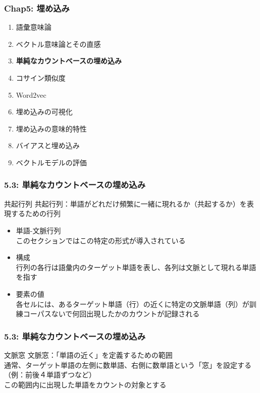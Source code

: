 \documentclass[unicode,11pt]{beamer} %
\begin{document}

\begin{frame}
    \frametitle{Chap5: 埋め込み}
    \begin{block}{}
        \begin{enumerate}
            \item 語彙意味論
            \item ベクトル意味論とその直感
            \item {\color{red}\textbf{単純なカウントベースの埋め込み}}
            \item コサイン類似度
            \item Word2vec
            \item 埋め込みの可視化
            \item 埋め込みの意味的特性
            \item バイアスと埋め込み
            \item ベクトルモデルの評価
        \end{enumerate}
    \end{block}
\end{frame}

\begin{frame}
    \frametitle{5.3: 単純なカウントベースの埋め込み}
    \begin{alertblock}{共起行列}
        共起行列：単語がどれだけ頻繁に一緒に現れるか（共起するか）を表現するための行列
        \begin{itemize}
            \item 単語-文脈行列\\このセクションではこの特定の形式が導入されている
            \item 構成\\行列の各行は語彙内のターゲット単語を表し、各列は文脈として現れる単語を指す
            \item 要素の値\\各セルには、あるターゲット単語（行）の近くに特定の文脈単語（列）が訓練コーパスないで何回出現したかのカウントが記録される
        \end{itemize}
    \end{alertblock}
\end{frame}

\begin{frame}
    \frametitle{5.3: 単純なカウントベースの埋め込み}
    \begin{alertblock}{文脈窓}
        文脈窓：「単語の近く」を定義するための範囲
        \\通常、ターゲット単語の左側に数単語、右側に数単語という「窓」を設定する（例：前後４単語ずつなど）
        \\この範囲内に出現した単語をカウントの対象とする
    \end{alertblock}
\end{frame}
\end{document}
